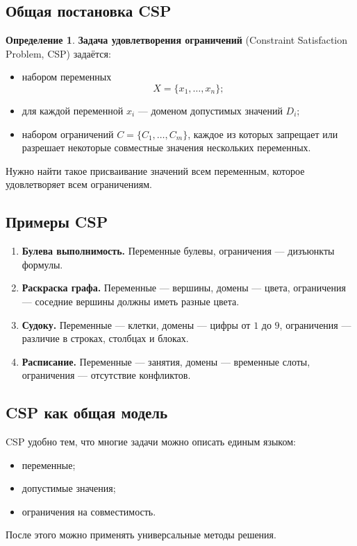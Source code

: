 \documentclass[12pt,a4paper]{article}
\theoremstyle{definition}
\newtheorem{definition}{Определение}[section]
\theoremstyle{plain}
\begin{document}
\subsection{Общая постановка CSP}
\begin{definition}
\textbf{Задача удовлетворения ограничений} (Constraint Satisfaction Problem, CSP) задаётся:
\begin{itemize}
\item набором переменных
\[
X=\{x_1,\dots,x_n\};
\]
\item для каждой переменной $x_i$ --- доменом допустимых значений $D_i$;
\item набором ограничений $C=\{C_1,\dots,C_m\}$, каждое из которых запрещает или разрешает некоторые совместные значения нескольких переменных.
\end{itemize}
Нужно найти такое присваивание значений всем переменным, которое удовлетворяет всем ограничениям.
\end{definition}

\subsection{Примеры CSP}
\begin{enumerate}
\item \textbf{Булева выполнимость.}
Переменные булевы, ограничения --- дизъюнкты формулы.

\item \textbf{Раскраска графа.}
Переменные --- вершины, домены --- цвета, ограничения --- соседние вершины должны иметь разные цвета.

\item \textbf{Судоку.}
Переменные --- клетки, домены --- цифры от $1$ до $9$, ограничения --- различие в строках, столбцах и блоках.

\item \textbf{Расписание.}
Переменные --- занятия, домены --- временные слоты, ограничения --- отсутствие конфликтов.
\end{enumerate}

\subsection{CSP как общая модель}
CSP удобно тем, что многие задачи можно описать единым языком:
\begin{itemize}
\item переменные;
\item допустимые значения;
\item ограничения на совместимость.
\end{itemize}
После этого можно применять универсальные методы решения.
\end{document}
